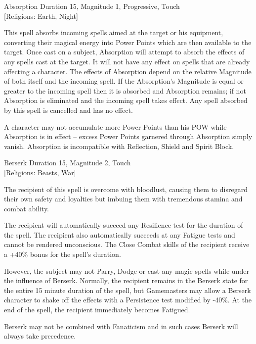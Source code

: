 \begin{rpg-spell}
{Absorption}
{Duration 15, Magnitude 1, Progressive, Touch\\{[Religions: Earth, Night]}}

This spell absorbs incoming spells aimed at the target or his equipment, converting their magical energy into Power Points which are then available to the target. Once cast on a subject, Absorption will attempt to absorb the effects of any spells cast at the target. It will not have any effect on spells that are already affecting a character. The effects of Absorption depend on the relative Magnitude of both itself and the incoming spell. If the Absorption's Magnitude is equal or greater to the incoming spell then it is absorbed and Absorption remains; if not Absorption is eliminated and the incoming spell takes effect. Any spell absorbed by this spell is cancelled and has no effect. 

A character may not accumulate more Power Points than his POW while Absorption is in effect – excess Power Points garnered through Absorption simply vanish. Absorption is incompatible with Reflection, Shield and Spirit Block.
\end{rpg-spell}

\begin{rpg-spell}
{Berserk}
{Duration 15, Magnitude 2, Touch\\{[Religions: Beasts, War]}}

The recipient of this spell is overcome with bloodlust, causing them to disregard their own safety and loyalties but imbuing them with tremendous stamina and combat ability. 

The recipient will automatically succeed any Resilience test for the duration of the spell. The recipient also automatically succeeds at any Fatigue tests and cannot be rendered unconscious. The Close Combat skills of the recipient receive a +40\% bonus for the spell’s duration. 

However, the subject may not Parry, Dodge or cast any magic spells while under the influence of Berserk. Normally, the recipient remains in the Berserk state for the entire 15 minute duration of the spell, but Gamemasters may allow a Berserk character to shake off the effects with a Persistence test modified by -40\%. At the end of the spell, the recipient immediately becomes Fatigued. 

Berserk may not be combined with Fanaticism and in such cases Berserk will always take precedence. 
\end{rpg-spell}

